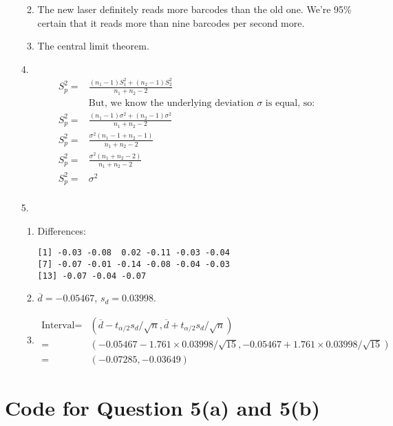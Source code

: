 \documentclass{article}
\begin{document}
\begin{enumerate}
\begin{enumerate}
\begin{equation*}
            \end{equation*}
        \item The new laser definitely reads more barcodes than the old one. We're 95\% certain that it reads more than nine barcodes per second more.
        \item The central limit theorem.
    \end{enumerate}
\item [4.] \begin{equation*}
        \begin{aligned}
            S^2_p =& \frac{(n_1 - 1) S_1^2 + (n_2 - 1) S_2^2}{n_1 + n_2 - 2} \\
                & \text{But, we know the underlying deviation }\sigma\text{ is equal, so:} \\
            S^2_p =& \frac{(n_1 - 1) \sigma^2 + (n_2 - 1) \sigma^2}{n_1 + n_2 - 2} \\
            S^2_p =& \frac{\sigma^2(n_1 - 1 + n_2 - 1)}{n_1 + n_2 - 2} \\
            S^2_p =& \frac{\sigma^2(n_1 + n_2 - 2)}{n_1 + n_2 - 2} \\
            S^2_p =& \sigma^2 \\
        \end{aligned}
        \end{equation*}
\item [5.]
    \begin{enumerate}
    \item Differences: \\
        \begin{lstlisting}
[1] -0.03 -0.08  0.02 -0.11 -0.03 -0.04
[7] -0.07 -0.01 -0.14 -0.08 -0.04 -0.03
[13] -0.07 -0.04 -0.07
        \end{lstlisting}
    \item $\overbar{d} = -0.05467$, $s_d = 0.03998$.
    \item
        \begin{equation*}
        \begin{aligned}
        \text{Interval} =& (\overbar{d} - t_{\alpha / 2} s_d / \sqrt n, \overbar{d} + t_{\alpha / 2} s_d / \sqrt n) \\
            =& (-0.05467 - 1.761 \times 0.03998 / \sqrt{15}, -0.05467 + 1.761 \times 0.03998 / \sqrt{15}) \\
            =& (-0.07285, -0.03649)
        \end{aligned}
        \end{equation*}
    \end{enumerate}
\end{enumerate}


\newpage
\appendix
\section{Code for Question 5(a) and 5(b)}

\end{document}

